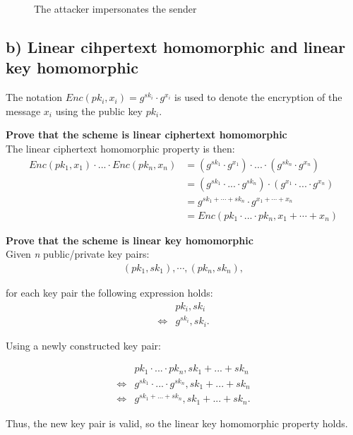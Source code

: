 \begin{figure}
\begin{tikzpicture}[x=0.75pt,y=0.75pt,yscale=-1,xscale=1]
    \end{tikzpicture}

    \caption{The attacker impersonates the sender}\label{fig:imp_sender}
\end{figure}

\subsection*{b) Linear cihpertext homomorphic and linear key homomorphic}
%
The notation \(Enc(pk_i, x_i)=g^{sk_i}\cdot g^{x_i}\) is used to denote the encryption of the
message \(x_i\) using the public key \(pk_i\).

\textbf{Prove that the scheme is linear ciphertext homomorphic}\\

The linear ciphertext homomorphic property is then:
\begin{align*}
    Enc(pk_1, x_1) \cdot...\cdot Enc(pk_n, x_n) &= (g^{sk_1}\cdot g^{x_1})
    \cdot...\cdot(g^{sk_n}\cdot g^{x_n})\\
    &= (g^{sk_1}\cdot...\cdot g^{sk_n})\cdot(g^{x_1}\cdot...\cdot g^{x_n})\\
    &= g^{sk_1+\cdots +sk_n}\cdot g^{x_1+\cdots +x_n}\\
    &= Enc(pk_1\cdot...\cdot pk_n, x_1+\cdots +x_n)
\end{align*}

\textbf{Prove that the scheme is linear key homomorphic}\\
Given \emph{n} public/private key pairs:\\
\begin{align*}
    (pk_1,sk_1),\cdots,(pk_n,sk_n),
\end{align*}

for each key pair the following expression holds:
\begin{align*}
    &pk_i,sk_i\\
    \Leftrightarrow &g^{sk_i},sk_i.
\end{align*}

Using a newly constructed key pair:

\begin{align*}
    &pk_1\cdot...\cdot pk_n, sk_1+...+ sk_n\\
    \Leftrightarrow &g^{sk_1}\cdot...\cdot g^{sk_n}, sk_1+...+ sk_n\\
    \Leftrightarrow &g^{sk_1+...+sk_n}, sk_1+...+sk_n.
\end{align*}

Thus, the new key pair is valid, so the linear key homomorphic property holds.

